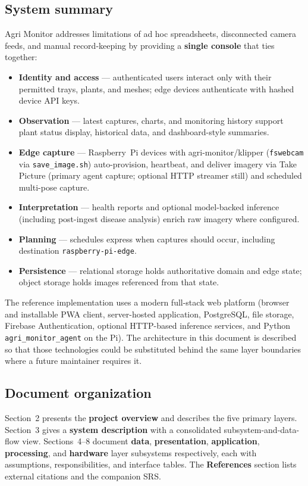 \subsection{System summary}

Agri Monitor addresses limitations of ad hoc spreadsheets, disconnected camera feeds, and manual record-keeping by providing a \textbf{single console} that ties together:

\begin{itemize}
  \item \textbf{Identity and access} — authenticated users interact only with their permitted trays, plants, and meshes; edge devices authenticate with hashed device API keys.
  \item \textbf{Observation} — latest captures, charts, and monitoring history support plant status display, historical data, and dashboard-style summaries.
  \item \textbf{Edge capture} — Raspberry~Pi devices with agri-monitor/klipper (\texttt{fswebcam} via \texttt{save\_image.sh}) auto-provision, heartbeat, and deliver imagery via Take Picture (primary agent capture; optional HTTP streamer still) and scheduled multi-pose capture.\cite{klipper}
  \item \textbf{Interpretation} — health reports and optional model-backed inference (including post-ingest disease analysis) enrich raw imagery where configured.
  \item \textbf{Planning} — schedules express when captures should occur, including destination \texttt{raspberry-pi-edge}.
  \item \textbf{Persistence} — relational storage holds authoritative domain and edge state; object storage holds images referenced from that state.
\end{itemize}

The reference implementation uses a modern full-stack web platform (browser and installable PWA client, server-hosted application, PostgreSQL, file storage, Firebase Authentication, optional HTTP-based inference services, and Python \texttt{agri\_monitor\_agent} on the Pi). The architecture in this document is described so that those technologies could be substituted behind the same layer boundaries where a future maintainer requires it.

\subsection{Document organization}

Section~2 presents the \textbf{project overview} and describes the five primary layers. Section~3 gives a \textbf{system description} with a consolidated subsystem-and-data-flow view. Sections~4--8 document \textbf{data}, \textbf{presentation}, \textbf{application}, \textbf{processing}, and \textbf{hardware} layer subsystems respectively, each with assumptions, responsibilities, and interface tables. The \textbf{References} section lists external citations and the companion SRS.
